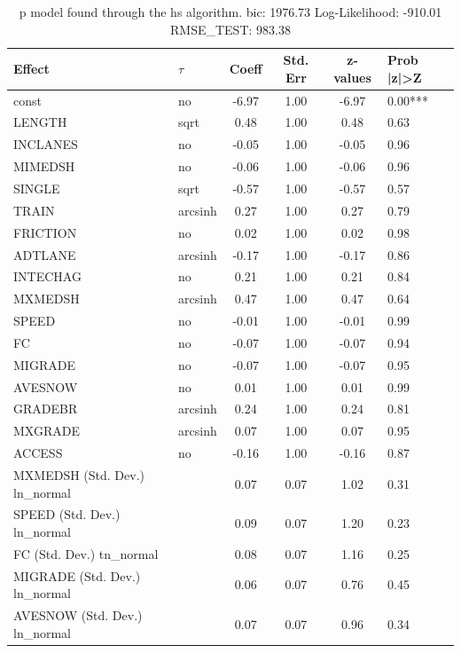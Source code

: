 \begin{table}
	\caption{p model found through the hs algorithm. bic: 1976.73 Log-Likelihood: -910.01 RMSE_TEST: 983.38}
	\begin{center}
		\begin{tabular}{|l|l|c|c|c|l|}
			\hline
			Effect & $\tau$ & Coeff & Std. Err & z-values & Prob |z|>Z \\
			\hline
			const & no & -6.97 & 1.00 & -6.97 & 0.00*** \\
			\hline
			LENGTH & sqrt & 0.48 & 1.00 & 0.48 & 0.63 \\
			\hline
			INCLANES & no & -0.05 & 1.00 & -0.05 & 0.96 \\
			\hline
			MIMEDSH & no & -0.06 & 1.00 & -0.06 & 0.96 \\
			\hline
			SINGLE & sqrt & -0.57 & 1.00 & -0.57 & 0.57 \\
			\hline
			TRAIN & arcsinh & 0.27 & 1.00 & 0.27 & 0.79 \\
			\hline
			FRICTION & no & 0.02 & 1.00 & 0.02 & 0.98 \\
			\hline
			ADTLANE & arcsinh & -0.17 & 1.00 & -0.17 & 0.86 \\
			\hline
			INTECHAG & no & 0.21 & 1.00 & 0.21 & 0.84 \\
			\hline
			MXMEDSH & arcsinh & 0.47 & 1.00 & 0.47 & 0.64 \\
			\hline
			SPEED & no & -0.01 & 1.00 & -0.01 & 0.99 \\
			\hline
			FC & no & -0.07 & 1.00 & -0.07 & 0.94 \\
			\hline
			MIGRADE & no & -0.07 & 1.00 & -0.07 & 0.95 \\
			\hline
			AVESNOW & no & 0.01 & 1.00 & 0.01 & 0.99 \\
			\hline
			GRADEBR & arcsinh & 0.24 & 1.00 & 0.24 & 0.81 \\
			\hline
			MXGRADE & arcsinh & 0.07 & 1.00 & 0.07 & 0.95 \\
			\hline
			ACCESS & no & -0.16 & 1.00 & -0.16 & 0.87 \\
			\hline
			MXMEDSH (Std. Dev.) ln_normal &  & 0.07 & 0.07 & 1.02 & 0.31 \\
			\hline
			SPEED (Std. Dev.) ln_normal &  & 0.09 & 0.07 & 1.20 & 0.23 \\
			\hline
			FC (Std. Dev.) tn_normal &  & 0.08 & 0.07 & 1.16 & 0.25 \\
			\hline
			MIGRADE (Std. Dev.) ln_normal &  & 0.06 & 0.07 & 0.76 & 0.45 \\
			\hline
			AVESNOW (Std. Dev.) ln_normal &  & 0.07 & 0.07 & 0.96 & 0.34 \\

\end{tabular}
\end{center}
\end{table}
